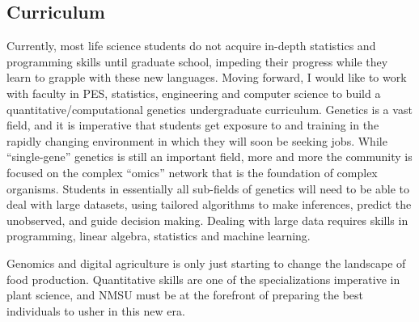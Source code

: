 \documentclass[11pt]{article}
\begin{document}
\subsection*{Curriculum}

Currently, most life science students do not acquire in-depth statistics and programming skills until graduate school, impeding their progress while they learn to grapple with these new languages. Moving forward, I would like to work with faculty in PES, statistics, engineering and computer science to build a quantitative/computational genetics undergraduate curriculum. Genetics is a vast field, and it is imperative that students get exposure to and training in the rapidly changing environment in which they will soon be seeking jobs. While ``single-gene'' genetics is still an important field, more and more the community is focused on the complex ``omics'' network that is the foundation of complex organisms. Students in essentially all sub-fields of genetics will need to be able to deal with large datasets, using tailored algorithms to make inferences, predict the unobserved, and guide decision making. Dealing with large data requires skills in programming, linear algebra, statistics and machine learning. 


\medskip

Genomics and digital agriculture is only just starting to change the landscape of food production. Quantitative skills are one of the specializations imperative in plant science, and NMSU must be at the forefront of preparing the best individuals to usher in this new era.
\end{document}
